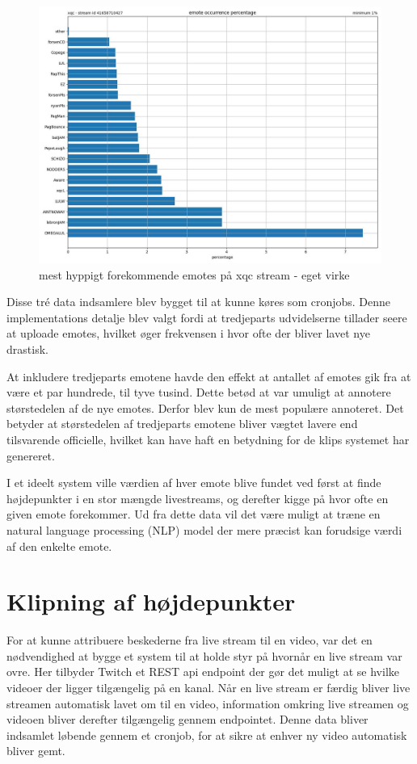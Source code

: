 \documentclass{article}
\begin{document}
\begin{figure}[hp]
\centering
\includegraphics[width=\textwidth]{emote-occurrence-xqc-41658710427.jpg}
\caption{mest hyppigt forekommende emotes på xqc stream - eget virke}
\end{figure}

Disse tré data indsamlere blev bygget til at kunne køres som cronjobs. Denne implementations detalje blev valgt fordi at tredjeparts udvidelserne tillader seere at uploade emotes, hvilket øger frekvensen i hvor ofte der bliver lavet nye drastisk.

At inkludere tredjeparts emotene havde den effekt at antallet af emotes gik fra at være et par hundrede, til tyve tusind. Dette betød at var umuligt at annotere størstedelen af de nye emotes. Derfor blev kun de mest populære annoteret. Det betyder at størstedelen af tredjeparts emotene bliver vægtet lavere end tilsvarende officielle, hvilket kan have haft en betydning for de klips systemet har genereret.

I et ideelt system ville værdien af hver emote blive fundet ved først at finde højdepunkter i en stor mængde livestreams, og derefter kigge på hvor ofte en given emote forekommer. Ud fra dette data vil det være muligt at træne en natural language processing (NLP) model der mere præcist kan forudsige værdi af den enkelte emote.

\section{Klipning af højdepunkter}
For at kunne attribuere beskederne fra live stream til en video, var det en nødvendighed at bygge et system til at holde styr på hvornår en live stream var ovre. Her tilbyder Twitch et REST api endpoint der gør det muligt at se hvilke videoer der ligger tilgængelig på en kanal. Når en live stream er færdig bliver live streamen automatisk lavet om til en video, information omkring live streamen og videoen bliver derefter tilgængelig gennem endpointet. Denne data bliver indsamlet løbende gennem et cronjob, for at sikre at enhver ny video automatisk bliver gemt.
\end{document}
